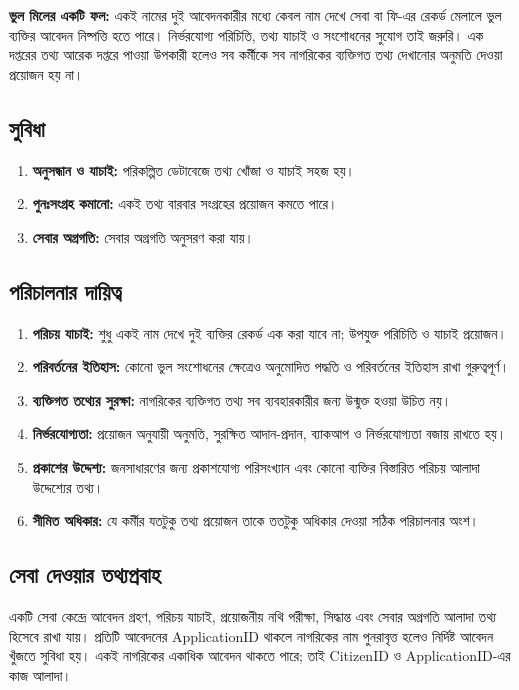 \textbf{ভুল মিলের একটি ফল:} একই নামের দুই আবেদনকারীর মধ্যে কেবল নাম দেখে সেবা বা ফি-এর রেকর্ড মেলালে ভুল ব্যক্তির আবেদন নিষ্পত্তি হতে পারে। নির্ভরযোগ্য পরিচিতি, তথ্য যাচাই ও সংশোধনের সুযোগ তাই জরুরি। এক দপ্তরের তথ্য আরেক দপ্তরে পাওয়া উপকারী হলেও সব কর্মীকে সব নাগরিকের ব্যক্তিগত তথ্য দেখানোর অনুমতি দেওয়া প্রয়োজন হয় না।

\subsection{সুবিধা}
\begin{enumerate}
\item \textbf{অনুসন্ধান ও যাচাই:} পরিকল্পিত ডেটাবেজে তথ্য খোঁজা ও যাচাই সহজ হয়।
\item \textbf{পুনঃসংগ্রহ কমানো:} একই তথ্য বারবার সংগ্রহের প্রয়োজন কমতে পারে।
\item \textbf{সেবার অগ্রগতি:} সেবার অগ্রগতি অনুসরণ করা যায়।
\end{enumerate}
\subsection{পরিচালনার দায়িত্ব}
\begin{enumerate}
\item \textbf{পরিচয় যাচাই:} শুধু একই নাম দেখে দুই ব্যক্তির রেকর্ড এক করা যাবে না; উপযুক্ত পরিচিতি ও যাচাই প্রয়োজন।
\item \textbf{পরিবর্তনের ইতিহাস:} কোনো ভুল সংশোধনের ক্ষেত্রেও অনুমোদিত পদ্ধতি ও পরিবর্তনের ইতিহাস রাখা গুরুত্বপূর্ণ।
\item \textbf{ব্যক্তিগত তথ্যের সুরক্ষা:} নাগরিকের ব্যক্তিগত তথ্য সব ব্যবহারকারীর জন্য উন্মুক্ত হওয়া উচিত নয়।
\item \textbf{নির্ভরযোগ্যতা:} প্রয়োজন অনুযায়ী অনুমতি, সুরক্ষিত আদান-প্রদান, ব্যাকআপ ও নির্ভরযোগ্যতা বজায় রাখতে হয়।
\item \textbf{প্রকাশের উদ্দেশ্য:} জনসাধারণের জন্য প্রকাশযোগ্য পরিসংখ্যান এবং কোনো ব্যক্তির বিস্তারিত পরিচয় আলাদা উদ্দেশ্যের তথ্য।
\item \textbf{সীমিত অধিকার:} যে কর্মীর যতটুকু তথ্য প্রয়োজন তাকে ততটুকু অধিকার দেওয়া সঠিক পরিচালনার অংশ।
\end{enumerate}

\subsection{সেবা দেওয়ার তথ্যপ্রবাহ}
একটি সেবা কেন্দ্রে আবেদন গ্রহণ, পরিচয় যাচাই, প্রয়োজনীয় নথি পরীক্ষা, সিদ্ধান্ত এবং সেবার অগ্রগতি আলাদা তথ্য হিসেবে রাখা যায়। প্রতিটি আবেদনের ApplicationID থাকলে নাগরিকের নাম পুনরাবৃত্ত হলেও নির্দিষ্ট আবেদন খুঁজতে সুবিধা হয়। একই নাগরিকের একাধিক আবেদন থাকতে পারে; তাই CitizenID ও ApplicationID-এর কাজ আলাদা।

